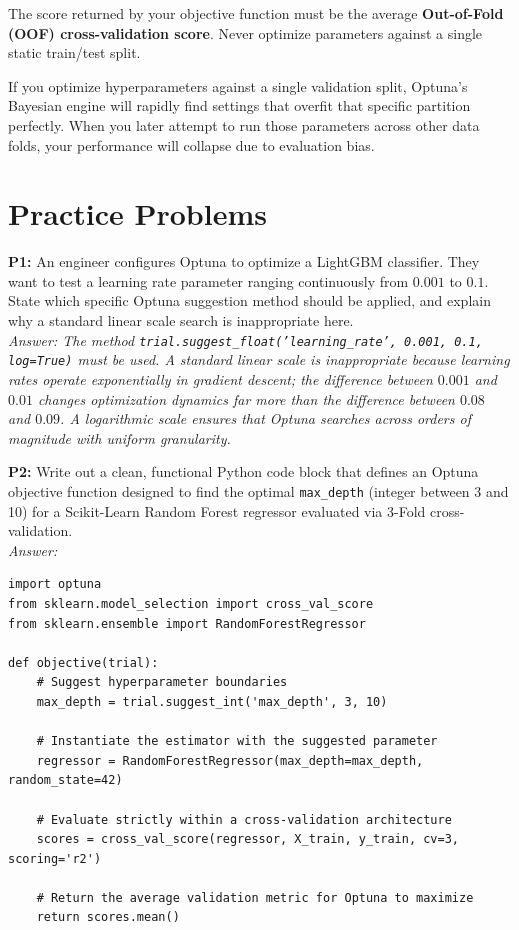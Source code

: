 \documentclass{article}
\begin{document}
\begin{tcolorbox}[colback=blue!5!white,colframe=blue!70!black,title=The Optimization Commandment]
The score returned by your objective function must be the average \textbf{Out-of-Fold (OOF) cross-validation score}. Never optimize parameters against a single static train/test split.
\end{tcolorbox}

If you optimize hyperparameters against a single validation split, Optuna's Bayesian engine will rapidly find settings that overfit that specific partition perfectly. When you later attempt to run those parameters across other data folds, your performance will collapse due to evaluation bias.

\newpage
\section{Practice Problems}

\textbf{P1:} An engineer configures Optuna to optimize a LightGBM classifier. They want to test a learning rate parameter ranging continuously from $0.001$ to $0.1$. State which specific Optuna suggestion method should be applied, and explain why a standard linear scale search is inappropriate here.
\\
\textit{Answer: The method \texttt{trial.suggest\_float('learning\_rate', 0.001, 0.1, log=True)} must be used. A standard linear scale is inappropriate because learning rates operate exponentially in gradient descent; the difference between $0.001$ and $0.01$ changes optimization dynamics far more than the difference between $0.08$ and $0.09$. A logarithmic scale ensures that Optuna searches across orders of magnitude with uniform granularity.}

\newline
\textbf{P2:} Write out a clean, functional Python code block that defines an Optuna objective function designed to find the optimal \texttt{max\_depth} (integer between 3 and 10) for a Scikit-Learn Random Forest regressor evaluated via 3-Fold cross-validation.
\\
\textit{Answer:}
\begin{verbatim}
import optuna
from sklearn.model_selection import cross_val_score
from sklearn.ensemble import RandomForestRegressor

def objective(trial):
    # Suggest hyperparameter boundaries
    max_depth = trial.suggest_int('max_depth', 3, 10)

    # Instantiate the estimator with the suggested parameter
    regressor = RandomForestRegressor(max_depth=max_depth, random_state=42)

    # Evaluate strictly within a cross-validation architecture
    scores = cross_val_score(regressor, X_train, y_train, cv=3, scoring='r2')

    # Return the average validation metric for Optuna to maximize
    return scores.mean()
\end{verbatim}
\end{document}
